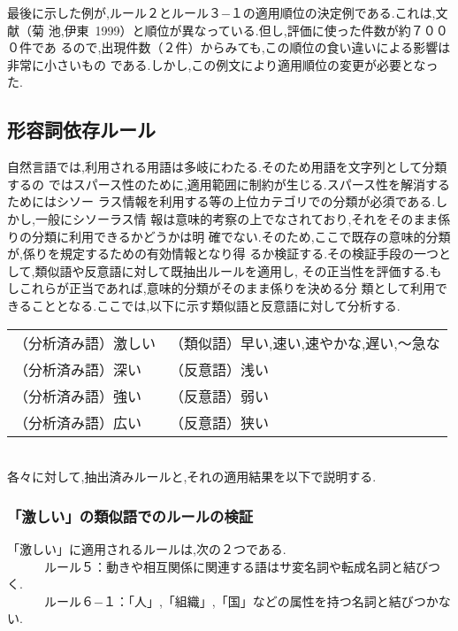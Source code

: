 最後に示した例が,ルール２とルール３−１の適用順位の決定例である.これは,文献（菊
池,伊東~1999）と順位が異なっている.但し,評価に使った件数が約７０００件であ
るので,出現件数（２件）からみても,この順位の食い違いによる影響は非常に小さいもの
である.しかし,この例文により適用順位の変更が必要となった.

\subsection{形容詞依存ルール}

自然言語では,利用される用語は多岐にわたる.そのため用語を文字列として分類するの
ではスパース性のために,適用範囲に制約が生じる.スパース性を解消するためにはシソー
ラス情報を利用する等の上位カテゴリでの分類が必須である.しかし,一般にシソーラス情
報は意味的考察の上でなされており,それをそのまま係りの分類に利用できるかどうかは明
確でない.そのため,ここで既存の意味的分類が,係りを規定するための有効情報となり得
るか検証する.その検証手段の一つとして,類似語や反意語に対して既抽出ルールを適用し,
その正当性を評価する.もしこれらが正当であれば,意味的分類がそのまま係りを決める分
類として利用できることとなる.ここでは,以下に示す類似語と反意語に対して分析する.\\
\begin{tabular}{l@{ →→ }l}
（分析済み語）激しい & （類似語）早い,速い,速やかな,遅い,〜急な\\
（分析済み語）深い   & （反意語）浅い\\
（分析済み語）強い   & （反意語）弱い\\
（分析済み語）広い   & （反意語）狭い
\end{tabular}\\
各々に対して,抽出済みルールと,それの適用結果を以下で説明する.

\subsubsection{「激しい」の類似語でのルールの検証}

「激しい」に適用されるルールは,次の２つである.\\
　　　ルール５：動きや相互関係に関連する語はサ変名詞や転成名詞と結びつく.\\
　　　ルール６−１：「人」,「組織」,「国」などの属性を持つ名詞と結びつかない.


